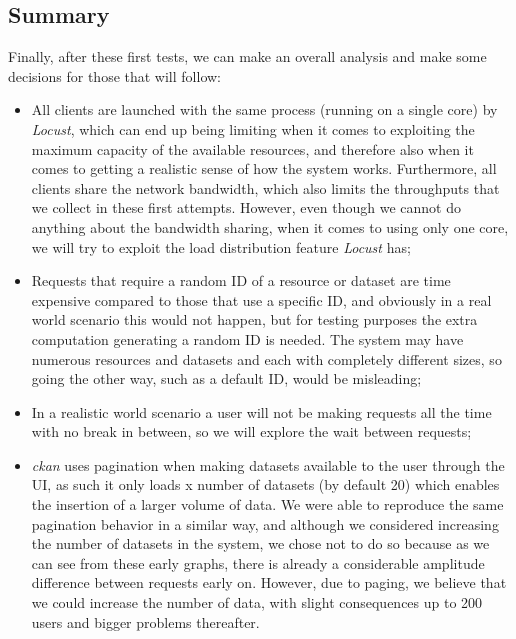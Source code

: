   
  \subsection{Summary}
  
  Finally, after these first tests, we can make an overall analysis and make some decisions for those that will follow:
  
  \begin{itemize}
      \item All clients are launched with the same process (running on a single core) by \textit{Locust}, which can end up being limiting when it comes to exploiting the maximum capacity of the available resources, and therefore also when it comes to getting a realistic sense of how the system works. Furthermore, all clients share the network bandwidth, which also limits the throughputs that we collect in these first attempts. However, even though we cannot do anything about the bandwidth sharing, when it comes to using only one core, we will try to exploit the load distribution feature \textit{Locust} has;
      \item Requests that require a random ID of a resource or dataset are time expensive compared to those that use a specific ID, and obviously in a real world scenario this would not happen, but for testing purposes the extra computation generating a random ID is needed. The system may have numerous resources and datasets and each with completely different sizes, so going the other way, such as a default ID, would be misleading; 
      \item In a realistic world scenario a user will not be making requests all the time with no break in between, so we will explore the wait between requests;
      \item \textit{\gls{ckan}} uses pagination when making datasets available to the user through the UI, as such it only loads x number of datasets (by default 20) which enables the insertion of a larger volume of data. We were able to reproduce the same pagination behavior in a similar way, and although we considered increasing the number of datasets in the system, we chose not to do so because as we can see from these early graphs, there is already a considerable amplitude difference between requests early on. However, due to paging, we believe that we could increase the number of data, with slight consequences up to 200 users and bigger problems thereafter. 
  \end{itemize}